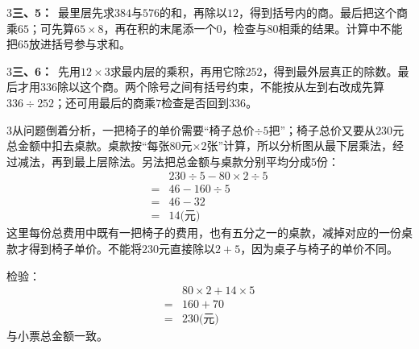 \documentclass[multi=snippet,border={5bp 20bp 5bp 5bp}]{standalone}
\newenvironment{snippet}[3]{\begin{minipage}{#1bp}\color{answerred}\fontsize{#2}{#3}\selectfont\raggedright}{\end{minipage}}
\begin{document}
\begin{snippet}{505}{11.5}{14}\begin{multicols}{3}\raggedcolumns \textbf{三、5：}\ 最里层先求\(384\)\allowbreak 与\(576\)\allowbreak 的和，再除以\(12\)\allowbreak ，得到括号内的商。最后把这个商乘\(65\)\allowbreak ；可先算\(65\times8\)\allowbreak ，再在积的末尾添一个\(0\)\allowbreak ，检查与\(80\)\allowbreak 相乘的结果。计算中不能把\(65\)\allowbreak 放进括号参与求和。\end{multicols}\end{snippet}
\begin{snippet}{505}{11.5}{14}\begin{multicols}{3}\raggedcolumns \textbf{三、6：}\ 先用\(12\times3\)\allowbreak 求最内层的乘积，再用它除\(252\)\allowbreak ，得到最外层真正的除数。最后才用\(336\)\allowbreak 除以这个商。两个除号之间有括号约束，不能按从左到右改成先算\(336\div252\)\allowbreak ；还可用最后的商乘\(7\)\allowbreak 检查是否回到\(336\)\allowbreak 。\end{multicols}\end{snippet}
\begin{snippet}{505}{11.5}{14}\begin{multicols}{3}\raggedcolumns 从问题倒着分析，一把椅子的单价需要“椅子总价\(\div5\)\allowbreak 把”；椅子总价又要从\(230\)\allowbreak 元总金额中扣去桌款。桌款按“每张\(80\)\allowbreak 元\(\times2\)\allowbreak 张”计算，所以分析图从最下层乘法，经过减法，再到最上层除法。另法把总金额与桌款分别平均分成\(5\)\allowbreak 份：\[\begin{aligned}&230\div5-80\times2\div5\\={}&46-160\div5\\={}&46-32\\={}&14\text{(元)}\end{aligned}\]这里每份总费用中既有一把椅子的费用，也有五分之一的桌款，减掉对应的一份桌款才得到椅子单价。不能将\(230\)\allowbreak 元直接除以\(2+5\)\allowbreak ，因为桌子与椅子的单价不同。\par 检验：\[\begin{aligned}&80\times2+14\times5\\={}&160+70\\={}&230\text{(元)}\end{aligned}\]与小票总金额一致。\end{multicols}\end{snippet}
\end{document}
